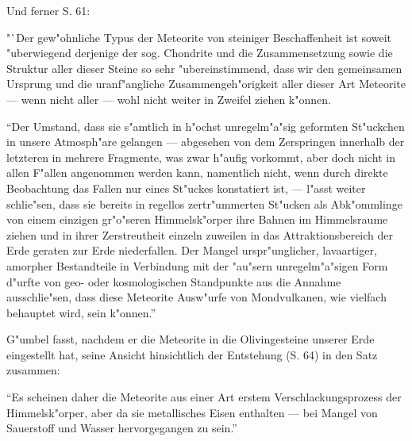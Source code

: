 \documentclass[a4paper, 11pt, oneside]{article}
\begin{document}
Und ferner S. 61:

"`Der gew"ohnliche Typus der Meteorite von steiniger Beschaffenheit ist soweit "uberwiegend derjenige der sog. Chondrite und die Zusammensetzung sowie die Struktur aller dieser Steine so sehr "ubereinstimmend, dass wir den gemeinsamen Ursprung und die uranf"angliche Zusammengeh"origkeit aller dieser Art Meteorite --- wenn nicht aller --- wohl nicht weiter in Zweifel ziehen k"onnen.

"`Der Umstand, dass sie s"amtlich in h"ochst unregelm"a"sig geformten St"uckchen in unsere Atmosph"are gelangen --- abgesehen von dem Zerspringen innerhalb der letzteren in mehrere Fragmente, was zwar h"aufig vorkommt, aber doch nicht in allen F"allen angenommen werden kann, namentlich nicht, wenn durch direkte Beobachtung das Fallen nur eines St"uckes konstatiert ist, --- l"asst weiter schlie"sen, dass sie bereits in regellos zertr"ummerten St"ucken als Abk"ommlinge von einem einzigen gr"o"seren Himmelsk"orper ihre Bahnen im Himmelsraume ziehen und in ihrer Zerstreutheit einzeln zuweilen in das Attraktionsbereich der Erde geraten zur Erde niederfallen. Der Mangel urspr"unglicher, lavaartiger, amorpher Bestandteile in Verbindung mit der "au"sern unregelm"a"sigen Form d"urfte von geo- oder kosmologischen Standpunkte aus die Annahme ausschlie"sen, dass diese Meteorite Ausw"urfe von Mondvulkanen, wie vielfach behauptet wird, sein k"onnen."'

G"umbel fasst, nachdem er die Meteorite in die Olivingesteine unserer Erde eingestellt hat, seine Ansicht hinsichtlich der Entstehung (S. 64) in den Satz zusammen:

"`Es scheinen daher die Meteorite aus einer Art erstem Verschlackungsprozess der Himmelsk"orper, aber da sie metallisches Eisen enthalten --- bei Mangel von Sauerstoff und Wasser hervorgegangen zu sein."'
\end{document}
